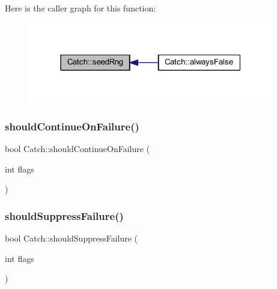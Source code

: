 Here is the caller graph for this function\+:\nopagebreak
\begin{figure}[H]
\begin{center}
\leavevmode
\includegraphics[width=304pt]{namespace_catch_a161400810eb0995394d6d8d3cae821ad_icgraph}
\end{center}
\end{figure}
\hypertarget{namespace_catch_a7f7480b15d74965459c844f0d393ed87}{}\label{namespace_catch_a7f7480b15d74965459c844f0d393ed87} 
\subsubsection{\texorpdfstring{should\+Continue\+On\+Failure()}{shouldContinueOnFailure()}}
{\footnotesize\ttfamily bool Catch\+::should\+Continue\+On\+Failure (\begin{DoxyParamCaption}\item[{int}]{flags }\end{DoxyParamCaption})\hspace{0.3cm}{\ttfamily [inline]}}

\hypertarget{namespace_catch_ab91eb13081203d634fe48d3d2ab386d7}{}\label{namespace_catch_ab91eb13081203d634fe48d3d2ab386d7} 
\subsubsection{\texorpdfstring{should\+Suppress\+Failure()}{shouldSuppressFailure()}}
{\footnotesize\ttfamily bool Catch\+::should\+Suppress\+Failure (\begin{DoxyParamCaption}\item[{int}]{flags }\end{DoxyParamCaption})\hspace{0.3cm}{\ttfamily [inline]}}

\hypertarget{namespace_catch_a695f62327be0676e046291eeaae15110}{}\label{namespace_catch_a695f62327be0676e046291eeaae15110} 
